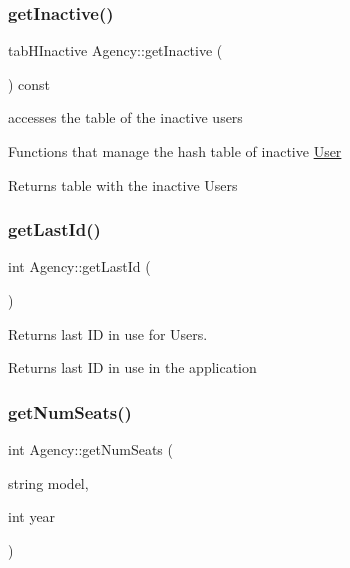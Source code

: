 \subsubsection{\texorpdfstring{get\+Inactive()}{getInactive()}}
{\footnotesize\ttfamily tab\+H\+Inactive Agency\+::get\+Inactive (\begin{DoxyParamCaption}{ }\end{DoxyParamCaption}) const}



accesses the table of the inactive users 

Functions that manage the hash table of inactive \hyperlink{class_user}{User} \begin{DoxyReturn}{Returns}
table with the inactive Users 
\end{DoxyReturn}
\mbox{\label{class_agency_a4f91eb604ad3eb3ea8142b8ab65b968d}} 
\subsubsection{\texorpdfstring{get\+Last\+Id()}{getLastId()}}
{\footnotesize\ttfamily int Agency\+::get\+Last\+Id (\begin{DoxyParamCaption}{ }\end{DoxyParamCaption})}



Returns last ID in use for Users. 

\begin{DoxyReturn}{Returns}
last ID in use in the application 
\end{DoxyReturn}
\mbox{\label{class_agency_a55fd7b63ca65ffdb6dfe8694301af29c}} 
\subsubsection{\texorpdfstring{get\+Num\+Seats()}{getNumSeats()}}
{\footnotesize\ttfamily int Agency\+::get\+Num\+Seats (\begin{DoxyParamCaption}\item[{string}]{model,  }\item[{int}]{year }\end{DoxyParamCaption})}



